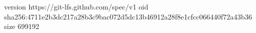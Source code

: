 version https://git-lfs.github.com/spec/v1
oid sha256:4711e2b3dc217a28b3c9bac072d5dc13b46912a28f8e1cfcc066440f72a43b36
size 699192
